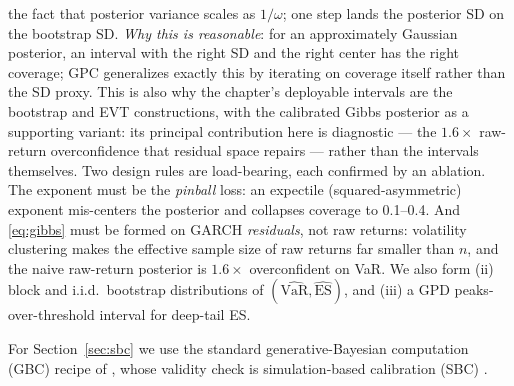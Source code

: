 \documentclass[11pt]{article}
\newcommand{\VaR}{\mathrm{VaR}}
\newcommand{\ES}{\mathrm{ES}}
\theoremstyle{remark}
\begin{document}
the fact that posterior variance scales as $1/\omega$; one step lands
the posterior SD on the bootstrap SD. \emph{Why this is reasonable}:
for an approximately Gaussian posterior, an interval with the right SD
and the right center has the right coverage; GPC generalizes exactly
this by iterating on coverage itself rather than the SD proxy. This is also why the chapter's
deployable intervals are the bootstrap and EVT constructions, with the
calibrated Gibbs posterior as a supporting variant: its principal
contribution here is diagnostic --- the $1.6\times$ raw-return
overconfidence that residual space repairs --- rather than the
intervals themselves. Two design rules are
load-bearing, each confirmed by an ablation. The exponent must be the
\emph{pinball} loss: an expectile (squared-asymmetric) exponent
mis-centers the posterior and collapses coverage to 0.1--0.4. And
\eqref{eq:gibbs} must be formed on GARCH \emph{residuals}, not raw
returns: volatility clustering makes the effective sample size of raw
returns far smaller than $n$, and the naive raw-return posterior is
$1.6\times$ overconfident on VaR. We also form (ii) block and i.i.d.\
bootstrap distributions of $(\widehat{\VaR}, \widehat{\ES})$, and (iii)
a GPD peaks-over-threshold interval for deep-tail ES.

For Section~\ref{sec:sbc} we use the standard generative-Bayesian
computation (GBC) recipe of
\citet{polson2023gbc}, whose validity check is simulation-based
calibration (SBC) \citep{talts2018sbc}.

\medskip\noindent{}
\end{document}
